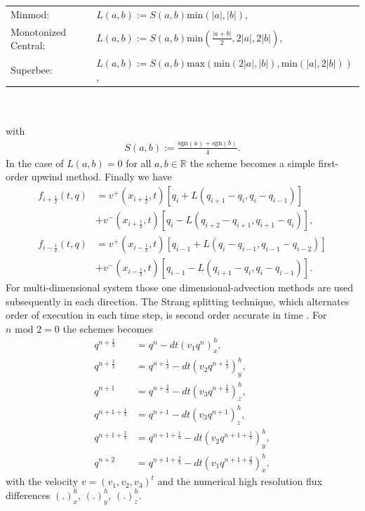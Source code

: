 \begin{tabular}{ll}
Minmod: & $L(a,b) := S(a,b)\text{min}\left(\left|a\right|,\left|b\right|\right)$, \\
Monotonized Central: & $L(a,b) := S(a,b)\text{min}\left(\frac{\left|a+b\right|}{2},2\left|a\right|,2\left|b\right|\right)$, \\
Superbee: & $L(a,b) := S(a,b)\text{max}\left(\text{min}\left(2\left|a\right|,\left|b\right|\right),\text{min}\left(\left|a\right|,2\left|b\right|\right)\right)$, \\
\end{tabular} 
\\
\\
with
\begin{align}
S(a,b) := \frac{\text{sgn}(a)+\text{sgn}(b)}{4}.
\end{align}
In the case of $L(a,b) = 0$ for all $a,b \in \mathbb{R}$ the scheme becomes a simple first-order upwind method.
Finally we have
\begin{align}
f_{i+\frac{1}{2}}(t,q) &= v^+(x_{i+\frac{1}{2}},t)\left[q_i+L(q_{i+1}-q_i,q_i-q_{i-1})\right]\\
                       &+ v^-(x_{i+\frac{1}{2}},t)\left[q_i-L(q_{i+2}-q_{i+1},q_{i+1}-q_{i})\right],\\
f_{i-\frac{1}{2}}(t,q) &= v^+(x_{i-\frac{1}{2}},t)\left[q_{i-1}+L(q_{i}-q_{i-1},q_{i-1}-q_{i-2})\right]\\
                       &+ v^-(x_{i-\frac{1}{2}},t)\left[q_{i-1}-L(q_{i+1}-q_{i},q_{i}-q_{i-1})\right].
\end{align}
For multi-dimensional system those one dimensional-advection methods are used subsequently in each direction. The Strang splitting technique, which alternates order of execution in each time step, is second order accurate in time .
For $n \text{ mod } 2 = 0$ the schemes becomes
\begin{align}
q^{n+\frac{1}{3}} &= q^n - dt(v_1q^n)_x^h, \\
q^{n+\frac{2}{3}} &= q^{n+\frac{1}{3}} - dt(v_2q^{n+\frac{1}{3}})_y^h, \\
q^{n+1} &= q^{n+\frac{2}{3}} - dt(v_3q^{n+\frac{2}{3}})_z^h, \\
q^{n+1+\frac{1}{3}} &= q^{n+1} - dt(v_3q^{n+1})_z^h, \\
q^{n+1+\frac{2}{3}} &= q^{n+1+\frac{1}{3}} - dt(v_2q^{n+1+\frac{1}{3}})_y^h, \\
q^{n+2} &= q^{n+1+\frac{2}{3}} - dt(v_1q^{n+1+\frac{2}{3}})_x^h,
\end{align}
with the velocity $v=(v_1,v_2,v_3)^t$ and the numerical high resolution flux differences $(.)_x^h$,  $(.)_y^h$,  $(.)_z^h$.

